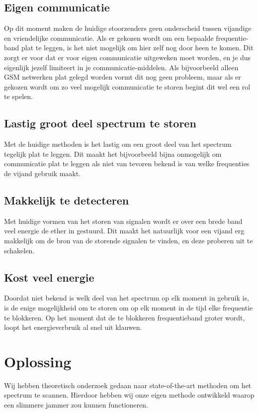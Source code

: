 \documentclass[oneside, a4paper, openany]{memoir}
\begin{document}
\section{Eigen communicatie}
Op dit moment maken de huidige stoorzenders geen onderscheid tussen vijandige en vriendelijke communicatie. Als er gekozen wordt om een bepaalde frequentie-band plat te leggen, is het niet mogelijk om hier zelf nog door heen te komen. Dit zorgt er voor dat er voor eigen communicatie uitgeweken moet worden, en je dus eigenlijk jezelf limiteert in je communicatie-middelen. Als bijvoorbeeld alleen GSM netwerken plat gelegd worden vormt dit nog geen probleem, maar als er gekozen wordt om zo veel mogelijk communicatie te storen begint dit wel een rol te spelen.

\section{Lastig groot deel spectrum te storen}
Met de huidige methoden is het lastig om een groot deel van het spectrum tegelijk plat te leggen. Dit maakt het bijvoorbeeld bijna onmogelijk om communicatie plat te leggen als niet van tevoren bekend is van welke frequenties de vijand gebruik maakt.

\section{Makkelijk te detecteren}
Met huidige vormen van het storen van signalen wordt er over een brede band veel energie de ether in gestuurd. Dit maakt het natuurlijk voor een vijand erg makkelijk om de bron van de storende signalen te vinden, en deze proberen uit te schakelen.

\section{Kost veel energie}
Doordat niet bekend is welk deel van het spectrum op elk moment in gebruik is, is de enige mogelijkheid om te storen om op elk moment in de tijd elke frequentie te blokkeren. Op het moment dat de te blokkeren frequentieband groter wordt, loopt het energieverbruik al snel uit klauwen.

\chapter{Oplossing}
Wij hebben theoretisch onderzoek gedaan naar state-of-the-art methoden om het spectrum te scannen. Hierdoor hebben wij onze eigen methode ontwikkeld waarop een slimmere jammer zou kunnen functioneren.
\end{document}
